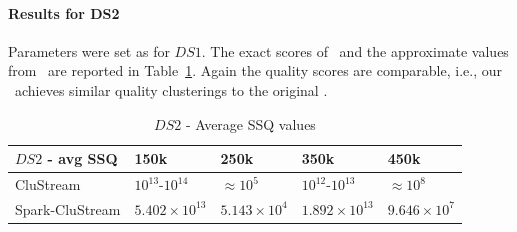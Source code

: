 \paragraph{Results for DS2}
Parameters were set as for $DS1$.
The exact scores of \our~and the approximate values from \clustream~are reported %
in Table~\ref{tab:DS2quality}. Again the quality scores are comparable, i.e., our \our~achieves similar quality clusterings to the original \clustream.
\begin{table}[t]
\centering
\begin{tabular}{|l|l|l|l|l|}\hline
\textbf{$DS2$ - avg SSQ} & \textbf{150k} & \textbf{250k} & \textbf{350k} & \textbf{450k}\\\hline
CluStream & $10^{13}$-$10^{14}$ & $\approx 10^{5}$ & $10^{12}$-$10^{13}$ & $\approx 10^{8}$\\\hline
Spark-CluStream & $5.402\times10^{13}$ & $5.143\times10^{4}$ & $1.892\times10^{13}$ & $9.646\times10^7$\\\hline
  \end{tabular}
  \caption{$DS2$ - Average SSQ values}
  \label{tab:DS2quality}
\end{table}

